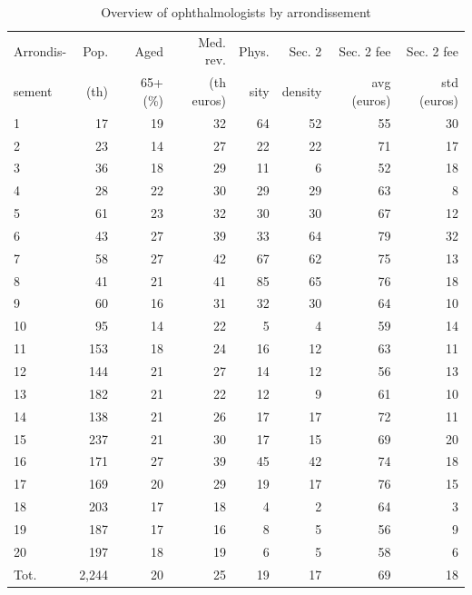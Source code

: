 \documentclass[11pt]{article}
\begin{document}
\begin{table}[h]
\caption{Overview of ophthalmologists by arrondissement}
\label{tab:Ophthalmo_stats_des}
\begin{tabular}{lrrrrrrr}
\hline
\hline
Arrondis-      & Pop.      & Aged       & Med. rev.  & Phys.  & Sec. 2  & Sec. 2 fee  & Sec. 2 fee  \\
sement         & (th)      & 65+ (\%)   & (th euros) & sity   & density & avg (euros) & std (euros) \\
\hline
1     & 17    & 19    & 32    & 64    & 52    & 55    & 30 \\
2     & 23    & 14    & 27    & 22    & 22    & 71    & 17 \\
3     & 36    & 18    & 29    & 11    & 6     & 52    & 18 \\
4     & 28    & 22    & 30    & 29    & 29    & 63    & 8 \\
5     & 61    & 23    & 32    & 30    & 30    & 67    & 12 \\
6     & 43    & 27    & 39    & 33    & 64    & 79    & 32 \\
7     & 58    & 27    & 42    & 67    & 62    & 75    & 13 \\
8     & 41    & 21    & 41    & 85    & 65    & 76    & 18 \\
9     & 60    & 16    & 31    & 32    & 30    & 64    & 10 \\
10    & 95    & 14    & 22    & 5     & 4     & 59    & 14 \\
11    & 153   & 18    & 24    & 16    & 12    & 63    & 11 \\
12    & 144   & 21    & 27    & 14    & 12    & 56    & 13 \\
13    & 182   & 21    & 22    & 12    & 9     & 61    & 10 \\
14    & 138   & 21    & 26    & 17    & 17    & 72    & 11 \\
15    & 237   & 21    & 30    & 17    & 15    & 69    & 20 \\
16    & 171   & 27    & 39    & 45    & 42    & 74    & 18 \\
17    & 169   & 20    & 29    & 19    & 17    & 76    & 15 \\
18    & 203   & 17    & 18    & 4     & 2     & 64    & 3 \\
19    & 187   & 17    & 16    & 8     & 5     & 56    & 9 \\
20    & 197   & 18    & 19    & 6     & 5     & 58    & 6 \\
\hline
Tot. & 2,244  & 20    & 25    & 19    & 17    & 69    & 18 \\
\hline
\hline
\end{tabular}%
\end{table}
\end{document}
